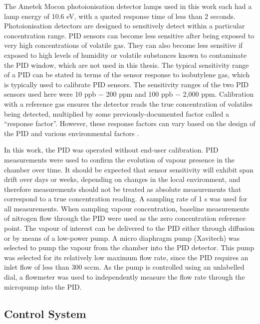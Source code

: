 \documentclass[
  a4paper,
]{scrbook}
\begin{document}
The Ametek Mocon photoionisation detector lamps used in this work each
had a lamp energy of 10.6 eV, with a quoted response time of less than 2
seconds. Photoionisation detectors are designed to sensitively detect
within a particular concentration range. PID sensors can become less
sensitive after being exposed to very high concentrations of volatile
gas. They can also become less sensitive if exposed to high levels of
humidity or volatile substances known to contaminate the PID window,
which are not used in this thesis. The typical sensitivity range of a
PID can be stated in terms of the sensor response to isobutylene gas,
which is typically used to calibrate PID sensors. The sensitivity ranges
of the two PID sensors used here were 10 ppb \(-\) 200 ppm and 100 ppb
\(-\) 2,000 ppm. Calibration with a reference gas ensures the detector
reads the true concentration of volatiles being detected, multiplied by
some previously-documented factor called a ``response factor''. However,
these response factors can vary based on the design of the PID and
various environmental factors \autocite{Ionscience,PIDmanual}.

In this work, the PID was operated without end-user calibration. PID
measurements were used to confirm the evolution of vapour presence in
the chamber over time. It should be expected that sensor sensitivity
will exhibit span drift over days or weeks, depending on changes in the
local environment, and therefore measurements should not be treated as
absolute measurements that correspond to a true concentration reading. A
sampling rate of 1 s was used for all measurements. When sampling vapour
concentration, baseline measurements of nitrogen flow through the PID
were used as the zero concentration reference point. The vapour of
interest can be delivered to the PID either through diffusion or by
means of a low-power pump. A micro diaphragm pump (Xavitech) was
selected to pump the vapour from the chamber into the PID detector. This
pump was selected for its relatively low maximum flow rate, since the
PID requires an inlet flow of less than 300 sccm. As the pump is
controlled using an unlabelled dial, a flowmeter was used to
independently measure the flow rate through the micropump into the PID.

\hypertarget{sec-control-system}{%
\subsection{Control System}\label{sec-control-system}}
\end{document}
